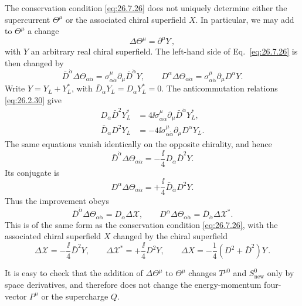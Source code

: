 The conservation condition \eqref{eq:26.7.26} does not uniquely determine
either the supercurrent \(\Theta^\mu\) or the associated chiral superfield
\(X\). In particular, we may add to \(\Theta^\mu\) a change
\begin{equation}
  \Delta\Theta^\mu=\partial^\mu Y\,,
  \tag{26.7.53}\label{eq:26.7.53}
\end{equation}
with \(Y\) an arbitrary real chiral superfield. The left-hand side of
Eq.~\eqref{eq:26.7.26} is then changed by
\[
  \bar D^{\dot\alpha}\Delta\Theta_{\alpha\dot\alpha}
  =\sigma^\mu_{\alpha\dot\alpha}
    \partial_\mu\bar D^{\dot\alpha}Y,
  \qquad
  D^\alpha\Delta\Theta_{\alpha\dot\alpha}
  =\sigma^\mu_{\alpha\dot\alpha}\partial_\mu D^\alpha Y .
\]
Write \(Y=Y_L+Y_L^*\), with
\(\bar D_{\dot\alpha}Y_L=D_\alpha Y_L^*=0\). The anticommutation relations
\eqref{eq:26.2.30} give
\[
  \begin{aligned}
  D_\alpha\bar D^2Y_L^*
  &=4\ii\sigma^\mu_{\alpha\dot\alpha}
    \partial_\mu\bar D^{\dot\alpha}Y_L^*,\\
  \bar D_{\dot\alpha}D^2Y_L
  &=-4\ii\sigma^\mu_{\alpha\dot\alpha}
    \partial_\mu D^\alpha Y_L .
  \end{aligned}
\]
The same equations vanish identically on the opposite chirality, and hence
\[
  \bar D^{\dot\alpha}\Delta\Theta_{\alpha\dot\alpha}
  =-\frac{\ii}{4}D_\alpha\bar D^2Y .
\]
Its conjugate is
\[
  D^\alpha\Delta\Theta_{\alpha\dot\alpha}
  =+\frac{\ii}{4}\bar D_{\dot\alpha}D^2Y .
\]
Thus the improvement obeys
\begin{equation}
  \bar D^{\dot\alpha}\Delta\Theta_{\alpha\dot\alpha}
  =D_\alpha\Delta\mathcal X,
  \qquad
  D^\alpha\Delta\Theta_{\alpha\dot\alpha}
  =\bar D_{\dot\alpha}\Delta\mathcal X^* .
  \tag{26.7.54}\label{eq:26.7.54}
\end{equation}
This is of the same form as the conservation condition \eqref{eq:26.7.26},
with the associated chiral superfield \(X\) changed by the chiral superfield
\begin{equation}
  \Delta\mathcal X=-\frac{\ii}{4}\bar D^2Y,\qquad
  \Delta\mathcal X^*=+\frac{\ii}{4}D^2Y,\qquad
  \Delta X=-\frac14(D^2+\bar D^2)Y\,.
  \tag{26.7.55}\label{eq:26.7.55}
\end{equation}

It is easy to check that the addition of \(\Delta\Theta^\mu\) to
\(\Theta^\mu\) changes \(T^{\mu0}\) and \(S_{\mathrm{new}}^0\) only by space
derivatives, and therefore does not change the energy-momentum four-vector
\(P^\mu\) or the supercharge \(Q\).

